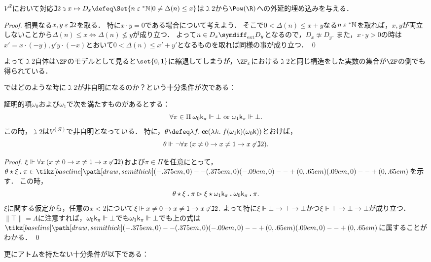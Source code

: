 \documentclass[realisability.tex]{subfiles}
\begin{document}
\begin{lemma}\label{lem:D-base-ext-inj}
 $V^{\mathcal{R}}$において対応$\gimel 2 \strni x \mapsto D_x \defeq \Set{n \strin \NN | 0 \neq \Delta(n) \leq x}$は$\gimel2$から$\Pow(\R)$への外延的埋め込みを与える．
\end{lemma}
\begin{proof}
 相異なる$x, y \mathrel{\varepsilon} \gimel 2$を取る．
 特に$x \cdot y = 0$である場合について考えよう．
 そこで$0 < \Delta(n) \leq x + y$なる$n \mathrel{\varepsilon} \mathord{{}^{*}\mathbb{N}}$を取れば，$x, y$が両立しないことから$\Delta(n) \leq x \iff \Delta(n) \nleq y$が成り立つ．
 よって$n \in D_x \symdiff_{\text{ext}} D_y$となるので，$D_x \not\simeq D_y$.
 また，$x \cdot y > 0$の時は$x' = x \cdot (- y), y' y \cdot (- x)$とおいて$0 < \Delta(n) \leq x' + y'$となるものを取れば同様の事が成り立つ． \qed
\end{proof}
よって$\gimel 2$自体は$\ZF$のモデルとして見ると$\set{0, 1}$に縮退してしまうが，$\ZFe$における$\gimel 2$と同じ構造をした実数の集合が$\ZF$の側でも得られている．

ではどのような時に$\gimel 2$が非自明になるのか？という十分条件が次である：
\begin{lemma}\label{lem:gimel2-nontriv}
 証明的項$\omega_0$および$\omega_1$で次を満たすものがあるとする：
 \[
  \forall \pi \in \Pi \: \omega_0 \mathsf{k}_\pi \Vdash \bot \text{ or } \omega_1 \mathsf{k}_\pi \Vdash \bot.
 \]
 この時，$\gimel 2$は$V^{(\mathcal{R})}$で非自明となっている．
 特に，$\theta \defeq \abs{f}{\cc (\abs{k}{f(\omega_1 \conti)(\omega_0 \conti)})}$とおけば，
 \[
  \theta \Vdash \neg \forall x \: (x \neq 0 \to x \neq 1 \to x \not\mathrel{\varepsilon} \gimel 2).
 \]
\end{lemma}
\begin{proof}
 $\xi \Vdash \forall x \: (x \neq 0 \to x \neq 1 \to x \not\mathrel{\varepsilon} \gimel 2)$および$\pi \in \Pi$を任意にとって，$\theta \cons \xi \push \pi\in \pole$を示す．
 この時，
 \[
  {\theta \mathbin{\star} \xi \mathbin{\boldsymbol{.}} \pi}
  \mathrel{\rhd} {\xi \mathbin{\star} {\omega_1 \mathsf{k}_{\pi}} \mathbin{\boldsymbol{.}} {\omega_0 \mathsf{k}_{\pi}} \mathbin{\boldsymbol{.}} \pi}.
 \]
 $\xi$に関する仮定から，任意の$x < 2$について$\xi \Vdash x \neq 0 \to x \neq 1 \to x \not\mathrel{\varepsilon} \gimel 2$.
 よって特に$\xi \Vdash \bot \to \top \to \bot$かつ$\xi \Vdash \top \to \bot \to \bot$が成り立つ．
 $\|\top\| = \Lambda$に注意すれば，$\omega_0 \mathsf{k}_\pi \Vdash \bot$でも$\omega_1 \mathsf{k}_\pi \Vdash \bot$でも上の式は$\pole$に属することがわかる． \qed
\end{proof}

更にアトムを持たない十分条件が以下である：
\end{document}
